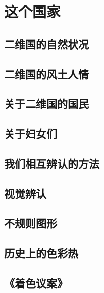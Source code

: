 \documentclass{book}
\begin{document}
\Large

\begin{spacing}{1.4}
\tableofcontents
\end{spacing}



\part{这个国家}

\chapter{二维国的自然状况}


\chapter{二维国的风土人情}


\chapter{关于二维国的国民}


\chapter{关于妇女们}


\chapter{我们相互辨认的方法}


\chapter{视觉辨认}


\chapter{不规则图形}


\chapter{历史上的色彩热}


\chapter{《着色议案》}

\end{document}
